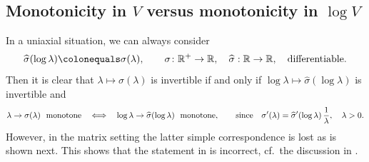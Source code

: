 \documentclass[10pt]{article}
\numberwithin{theoremCounter}{section}
\theoremstyle{plain}
\theoremstyle{definition}
\numberwithin{equation}{section}
\begin{document}
\begin{appendix}
\subsection{Monotonicity in $V$ versus monotonicity in $\log V$} \label{appmono001}
%
	 In a uniaxial situation, we can always consider 
	 \begin{align}
	 \widehat{\sigma}(\log \lambda)\colonequals\sigma(\lambda), \qquad \sigma\colon\mathbb{R}^+\to \mathbb{R}, \quad \widehat{\sigma}:\mathbb{R}\to \mathbb{R}, \quad \textnormal{differentiable}.
	 \end{align}
	 Then it is clear that $\lambda \mapsto \sigma(\lambda)$ is invertible if and only if $\log \lambda \mapsto \widehat \sigma(\log \lambda)$ is invertible and
	 \begin{align}
	 \lambda\to \sigma(\lambda) 
	 \ \ \textnormal{monotone}\ \ \iff \ \  \log\lambda\to \widehat{\sigma}(\log\lambda) \ \ \textnormal{monotone}, \qquad \textnormal{since} \quad \sigma'(\lambda) = \widehat \sigma'(\log \lambda) \, \frac{1}{\lambda}, \quad \lambda > 0.
	 \end{align}
	 However, in the matrix setting the latter simple correspondence is lost as is shown next. This shows that the statement in \cite[eq.~50]{jog2013conditions} is incorrect, cf.~the discussion in \cite{NeffMartin14}.
%

\end{appendix}
\end{document}
